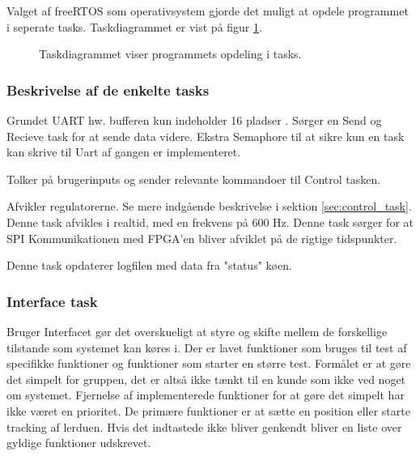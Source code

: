 Valget af freeRTOS som operativsystem gjorde det muligt at opdele programmet i seperate tasks. Taskdiagrammet er vist på figur \ref{fig:task_diagram}. 

\begin{figure}[!h]
\centering
\begin{tikzpicture}[node distance = 3.2cm]
	
\end{tikzpicture}
\caption[Task diagram]{Taskdiagrammet viser programmets opdeling i tasks.}
\label{fig:task_diagram}
\end{figure}

\subsubsection{Beskrivelse af de enkelte tasks}
\begin{description}
\itemsep-3pt
	\item[UART] Grundet UART hw. bufferen kun indeholder 16 pladser \citep[Side. 430]{lm3s6965}. Sørger en Send og Recieve task for at sende data videre. Ekstra Semaphore til at sikre kun en task kan skrive til Uart af gangen er implementeret.
	\item[Interface] Tolker på brugerinputs og sender relevante kommandoer til Control tasken.
	\item[Control] Afvikler regulatorerne. Se mere indgående beskrivelse i sektion \ref{sec:control_task}. Denne task afvikles i realtid, med en frekvens på 600 Hz. 
	Denne task sørger for at SPI Kommunikationen med FPGA'en bliver afviklet på de rigtige tidspunkter.
	\item[Logger] Denne task opdaterer logfilen med data fra "status" køen.
\end{description}

\subsubsection{Interface task}
\label{sec:interface}
Bruger Interfacet gør det overskueligt at styre og skifte mellem de forskellige tilstande som systemet kan køres i.
Der er lavet funktioner som bruges til test af specifikke funktioner og funktioner som starter en større test.
Formålet er at gøre det simpelt for gruppen, det er altså ikke tænkt til en kunde som ikke ved noget om systemet.
Fjernelse af implementerede funktioner for at gøre det simpelt har ikke været en prioritet. 
De primære funktioner er at sætte en position eller starte tracking af lerduen.
Hvis det indtastede ikke bliver genkendt bliver en liste over gyldige funktioner udskrevet.

